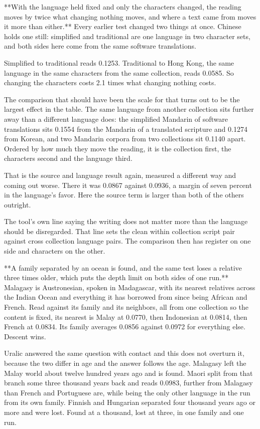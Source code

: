 **With the language held fixed and only the characters changed, the reading moves by twice what changing nothing moves, and where a text came from moves it more than either.** Every earlier test changed two things at once. Chinese holds one still: simplified and traditional are one language in two character sets, and both sides here come from the same software translations.

Simplified to traditional reads 0.1253. Traditional to Hong Kong, the same language in the same characters from the same collection, reads 0.0585. So changing the characters costs 2.1 times what changing nothing costs.

The comparison that should have been the scale for that turns out to be the largest effect in the table. The same language from another collection sits further away than a different language does: the simplified Mandarin of software translations sits 0.1554 from the Mandarin of a translated scripture and 0.1274 from Korean, and two Mandarin corpora from two collections sit 0.1140 apart. Ordered by how much they move the reading, it is the collection first, the characters second and the language third.

That is the source and language result again, measured a different way and coming out worse. There it was 0.0867 against 0.0936, a margin of seven percent in the language's favor. Here the source term is larger than both of the others outright.

The tool's own line saying the writing does not matter more than the language should be disregarded. That line sets the clean within collection script pair against cross collection language pairs. The comparison then has register on one side and characters on the other.

**A family separated by an ocean is found, and the same test loses a relative three times older, which puts the depth limit on both sides of one run.** Malagasy is Austronesian, spoken in Madagascar, with its nearest relatives across the Indian Ocean and everything it has borrowed from since being African and French. Read against its family and its neighbors, all from one collection so the content is fixed, its nearest is Malay at 0.0770, then Indonesian at 0.0814, then French at 0.0834. Its family averages 0.0856 against 0.0972 for everything else. Descent wins.

Uralic answered the same question with contact and this does not overturn it, because the two differ in age and the answer follows the age. Malagasy left the Malay world about twelve hundred years ago and is found. Maori split from that branch some three thousand years back and reads 0.0983, further from Malagasy than French and Portuguese are, while being the only other language in the run from its own family. Finnish and Hungarian separated four thousand years ago or more and were lost. Found at a thousand, lost at three, in one family and one run.

